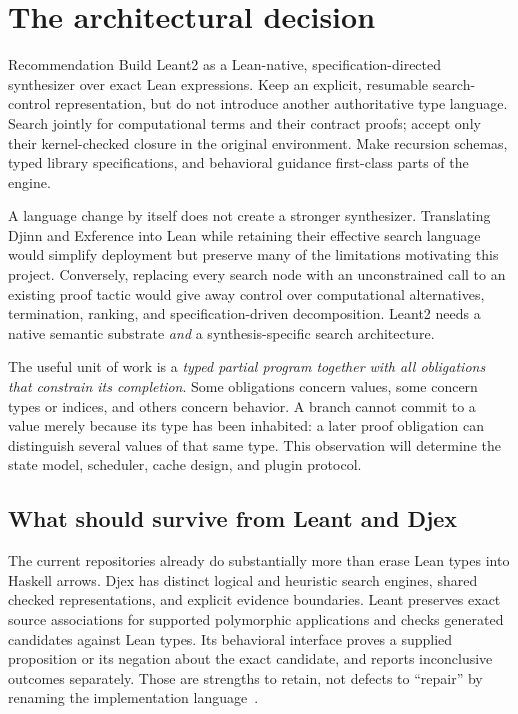 \section{The architectural decision}

\begin{designbox}{Recommendation}
Build Leant2 as a Lean-native, specification-directed synthesizer over exact
Lean expressions. Keep an explicit, resumable search-control representation,
but do not introduce another authoritative type language. Search jointly for
computational terms and their contract proofs; accept only their kernel-checked
closure in the original environment. Make recursion schemas, typed library
specifications, and behavioral guidance first-class parts of the engine.
\end{designbox}

A language change by itself does not create a stronger synthesizer. Translating
Djinn and Exference into Lean while retaining their effective search language
would simplify deployment but preserve many of the limitations motivating this
project. Conversely, replacing every search node with an unconstrained call to
an existing proof tactic would give away control over computational alternatives,
termination, ranking, and specification-driven decomposition. Leant2 needs a
native semantic substrate \emph{and} a synthesis-specific search architecture.

The useful unit of work is a \emph{typed partial program together with all
obligations that constrain its completion}. Some obligations concern values,
some concern types or indices, and others concern behavior. A branch cannot
commit to a value merely because its type has been inhabited: a later proof
obligation can distinguish several values of that same type. This observation
will determine the state model, scheduler, cache design, and plugin protocol.

\subsection{What should survive from Leant and Djex}

The current repositories already do substantially more than erase Lean types
into Haskell arrows. Djex has distinct logical and heuristic search engines,
shared checked representations, and explicit evidence boundaries. Leant
preserves exact source associations for supported polymorphic applications and
checks generated candidates against Lean types. Its behavioral interface proves
a supplied proposition or its negation about the exact candidate, and reports
inconclusive outcomes separately. Those are strengths to retain, not defects to
``repair'' by renaming the implementation language~\cite{djex-architecture,leant-internals,leant-behavior}.

